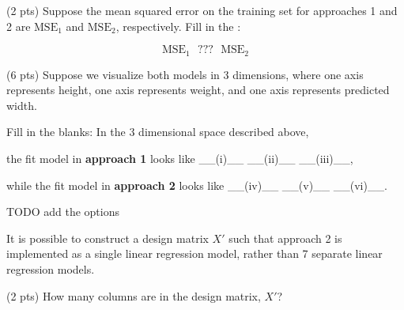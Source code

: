 \documentclass[twoside,12pt]{article}
\begin{document}
\begin{probset}
\begin{prob}[(14 pts)]
\begin{subprobset}
\begin{subprob}(2 pts) Suppose the mean squared error on the training set for approaches 1 and 2 are $\text{MSE}_1$ and $\text{MSE}_2$, respectively. Fill in the : 

$$\displaystyle \text{MSE}_1 \:\:\: \boxed{???} \:\:\: \text{MSE}_2$$

\bubble{$\geq$} 

\bubble{$>$} 

\bubble{$=$} 

\bubble{$<$} 

\bubble{$\leq$} 


\end{subprob}

\vspace{0.2in}

\begin{subprob}(6 pts) Suppose we visualize both models in 3 dimensions, where one axis represents height, one axis represents weight, and one axis represents predicted width.

\vspace{0.1in}

Fill in the blanks: In the 3 dimensional space described above, 

the fit model in \textbf{approach 1} looks like \_\_(i)\_\_ \_\_(ii)\_\_ \_\_(iii)\_\_,

while the fit model in \textbf{approach 2} looks like \_\_(iv)\_\_ \_\_(v)\_\_ \_\_(vi)\_\_.

\vspace{0.1in}

TODO add the options

\end{subprob}

\end{subprobset}

\newpage

It is possible to construct a design matrix $X'$ such that approach 2 is implemented as a single linear regression model, rather than 7 separate linear regression models.

\begin{subprobset}

\begin{subprob}(2 pts) How many columns are in the design matrix, $X'$? 



\end{subprob}
\end{subprobset}
\end{prob}
\end{probset}
\end{document}
